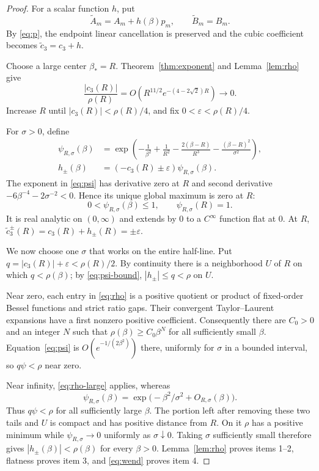 \documentclass[11pt]{article}
\theoremstyle{definition}
\theoremstyle{remark}
\begin{document}
\begin{proof}
For a scalar function $h$, put
\[
 \widetilde A_m=A_m+h(\beta)p_m,
 \qquad \widetilde B_m=B_m.
\]
By \eqref{eq:p}, the endpoint linear cancellation is preserved and the
cubic coefficient becomes $\widetilde c_3=c_3+h$.

Choose a large center $\beta_*=R$.  Theorem~\ref{thm:exponent} and
Lemma~\ref{lem:rho} give
\[
 \frac{|c_3(R)|}{\rho(R)}
 =O\!\left(R^{11/2}e^{-(4-2\sqrt2)R}\right)\longrightarrow0.
\]
Increase $R$ until $|c_3(R)|<\rho(R)/4$, and fix
$0<\varepsilon<\rho(R)/4$.

For $\sigma>0$, define
\begin{align}
 \psi_{R,\sigma}(\beta)
 &=\exp\!\left(-\frac1{\beta^2}+\frac1{R^2}
 -\frac{2(\beta-R)}{R^3}-\frac{(\beta-R)^2}{\sigma^2}\right),
 \label{eq:psi}\\
 h_\pm(\beta)&=(-c_3(R)\pm\varepsilon)\psi_{R,\sigma}(\beta).
 \label{eq:hpm}
\end{align}
The exponent in \eqref{eq:psi} has derivative zero at $R$ and second
derivative $-6\beta^{-4}-2\sigma^{-2}<0$.  Hence its unique global
maximum is zero at $R$:
\begin{equation}\label{eq:psi-bound}
 0<\psi_{R,\sigma}(\beta)\leq1,
 \qquad \psi_{R,\sigma}(R)=1.
\end{equation}
It is real analytic on $(0,\infty)$ and extends by $0$ to a
$C^\infty$ function flat at $0$.  At $R$,
$\widetilde c_3^\pm(R)=c_3(R)+h_\pm(R)=\pm\varepsilon$.

We now choose one $\sigma$ that works on the entire half-line.  Put
$q=|c_3(R)|+\varepsilon<\rho(R)/2$.  By continuity there is a
neighborhood $U$ of $R$ on which $q<\rho(\beta)$; by
\eqref{eq:psi-bound}, $|h_\pm|\leq q<\rho$ on $U$.

Near zero, each entry in \eqref{eq:rho} is a positive quotient or product
of fixed-order Bessel functions and strict ratio gaps.  Their convergent
Taylor--Laurent expansions have a first nonzero positive coefficient.
Consequently there are $C_0>0$ and an integer $N$ such that
$\rho(\beta)\geq C_0\beta^N$ for all sufficiently small $\beta$.
Equation~\eqref{eq:psi} is $O(e^{-1/(2\beta^2)})$ there, uniformly for
$\sigma$ in a bounded interval, so $q\psi<\rho$ near zero.

Near infinity, \eqref{eq:rho-large} applies, whereas
\[
 \psi_{R,\sigma}(\beta)
 =\exp\bigl(-\beta^2/\sigma^2+O_{R,\sigma}(\beta)\bigr).
\]
Thus $q\psi<\rho$ for all sufficiently large $\beta$.  The portion left
after removing these two tails and $U$ is compact and has positive distance
from $R$.  On it $\rho$ has a positive minimum while
$\psi_{R,\sigma}\to0$ uniformly as $\sigma\downarrow0$.  Taking $\sigma$
sufficiently small therefore gives $|h_\pm(\beta)|<\rho(\beta)$ for every
$\beta>0$.  Lemma~\ref{lem:rho} proves items 1--2, flatness proves item 3,
and \eqref{eq:wend} proves item 4.
\end{proof}
\end{document}
